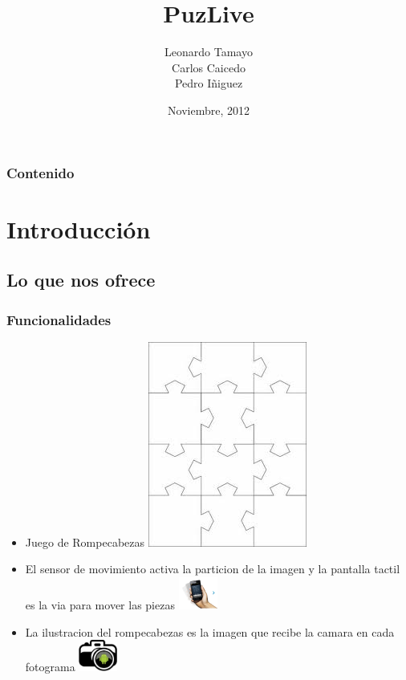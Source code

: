 \documentclass[serif,11pt]{beamer}
\begin{document}
	\title {PuzLive}  
	\author {Leonardo Tamayo\\ Carlos Caicedo \\ Pedro I\~niguez}
	\date[Noviembre, 2012]{Noviembre, 2012\\}


	\begin{frame}
		\titlepage
	\end{frame}

	\begin{frame}
		\frametitle{Contenido}\tableofcontents
	\end{frame} 


	\section{Introducci\'on} 

		\subsection{Lo que nos ofrece}

			\begin{frame}\frametitle{Funcionalidades}
				\pause
				\bigskip

				\begin{itemize}
					 \bigskip
					\item Juego de Rompecabezas 
					\pause
					\includegraphics[height=0.1\textwidth]{rompeca} 
					\bigskip
					\pause

					\item El sensor de movimiento activa la particion de la imagen y la pantalla tactil es la via para mover las piezas 
					\pause
					\includegraphics[width=0.1\textwidth]{shake} 
					\bigskip
					\pause
					\item La ilustracion del rompecabezas es la imagen que recibe la camara en cada fotograma
					\bigskip
					\pause
					\includegraphics[width=0.1\textwidth]{camara1} 
					\bigskip

				\end{itemize}
			\end{frame}
\end{document}
